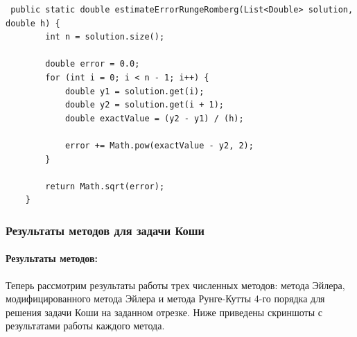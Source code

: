 \documentclass[12pt]{article}
\begin{document}
    \begin{verbatim}
 public static double estimateErrorRungeRomberg(List<Double> solution, double h) {
        int n = solution.size();

        double error = 0.0;
        for (int i = 0; i < n - 1; i++) {
            double y1 = solution.get(i);
            double y2 = solution.get(i + 1);
            double exactValue = (y2 - y1) / (h);

            error += Math.pow(exactValue - y2, 2);
        }

        return Math.sqrt(error);
    }
    \end{verbatim}

    \subsubsection{Результаты методов для задачи Коши}

    \paragraph*{Результаты методов:}
    Теперь рассмотрим результаты работы трех численных методов: метода Эйлера, модифицированного метода Эйлера и метода Рунге-Кутты 4-го порядка для решения задачи Коши на заданном отрезке. Ниже приведены скриншоты с результатами работы каждого метода.

    \clearpage
\end{document}
